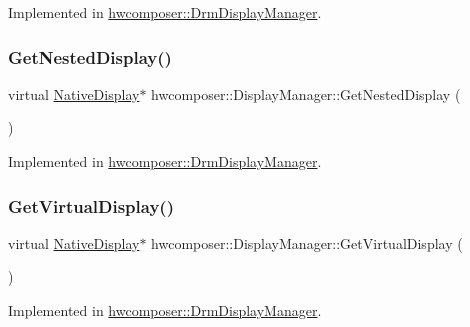 Implemented in \mbox{\hyperlink{classhwcomposer_1_1DrmDisplayManager_aed1b4e61f4bbda4069138675156a9564}{hwcomposer\+::\+Drm\+Display\+Manager}}.

\mbox{\label{classhwcomposer_1_1DisplayManager_ac05cc0db0d8191465746828b2027a6f7}} 
\subsubsection{\texorpdfstring{Get\+Nested\+Display()}{GetNestedDisplay()}}
{\footnotesize\ttfamily virtual \mbox{\hyperlink{classhwcomposer_1_1NativeDisplay}{Native\+Display}}$\ast$ hwcomposer\+::\+Display\+Manager\+::\+Get\+Nested\+Display (\begin{DoxyParamCaption}{ }\end{DoxyParamCaption})\hspace{0.3cm}{\ttfamily [pure virtual]}}



Implemented in \mbox{\hyperlink{classhwcomposer_1_1DrmDisplayManager_ae3df43b4c4c9cc1181ec13cbefd764f1}{hwcomposer\+::\+Drm\+Display\+Manager}}.

\mbox{\label{classhwcomposer_1_1DisplayManager_a5fa2b92896cab774d8a85215dfac1d62}} 
\subsubsection{\texorpdfstring{Get\+Virtual\+Display()}{GetVirtualDisplay()}}
{\footnotesize\ttfamily virtual \mbox{\hyperlink{classhwcomposer_1_1NativeDisplay}{Native\+Display}}$\ast$ hwcomposer\+::\+Display\+Manager\+::\+Get\+Virtual\+Display (\begin{DoxyParamCaption}{ }\end{DoxyParamCaption})\hspace{0.3cm}{\ttfamily [pure virtual]}}



Implemented in \mbox{\hyperlink{classhwcomposer_1_1DrmDisplayManager_a80e39b4389e271ed5a72421c46ce5f36}{hwcomposer\+::\+Drm\+Display\+Manager}}.

